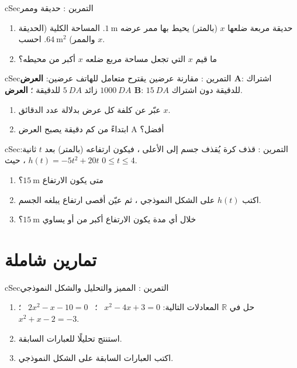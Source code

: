 \documentclass[12pt,a4paper]{article}
\newenvironment{BOX}[2]{\begin{otherlanguage}{english}\begin{arbox}{#1}{#2}}{\end{arbox}\end{otherlanguage}}
\newcounter{exo}
\newenvironment{tamrin}[1]{\stepcounter{exo}\begin{BOX}{cSec}{التمرين \theexo: #1}}{\end{BOX}}
\newcommand{\R}{\mathbb{R}}
\begin{document}
\begin{tamrin}{حديقة وممر}
\begin{enumerate}
\item حديقة مربعة ضلعها $x$ (بالمتر) يحيط بها ممر عرضه $1\ \text{m}$. المساحة الكلية (الحديقة والممر) $64\ \text{m}^2$. احسب $x$.
\item ما قيم $x$ التي تجعل مساحة مربع ضلعه $x$ أكبر من محيطه؟
\end{enumerate}
\end{tamrin}

\begin{tamrin}{مقارنة عرضين}
يقترح متعامل للهاتف عرضين: \textbf{العرض A}: اشتراك $1000\ DA$ زائد $5\ DA$ للدقيقة ؛ \textbf{العرض B}: $15\ DA$ للدقيقة دون اشتراك.
\begin{enumerate}
\item عبّر عن كلفة كل عرض بدلالة عدد الدقائق $x$.
\item ابتداءً من كم دقيقة يصبح العرض A أفضل؟
\end{enumerate}
\end{tamrin}

\begin{tamrin}{قذف كرة}
يُقذف جسم إلى الأعلى ، فيكون ارتفاعه (بالمتر) بعد $t$ ثانية: $h(t)=-5t^2+20t$ ، حيث $0\leqslant t\leqslant4$.
\begin{enumerate}
\item متى يكون الارتفاع $15\ \text{m}$؟
\item اكتب $h(t)$ على الشكل النموذجي ، ثم عيّن أقصى ارتفاع يبلغه الجسم.
\item خلال أي مدة يكون الارتفاع أكبر من أو يساوي $15\ \text{m}$؟
\end{enumerate}
\end{tamrin}

\section{تمارين شاملة}
\begin{tamrin}{المميز والتحليل والشكل النموذجي}
\begin{enumerate}
\item حل في $\R$ المعادلات التالية: \quad $x^2-4x+3=0$ \ ؛ \ $2x^2-x-10=0$ \ ؛ \ $x^2+x-2=-3$.
\item استنتج تحليلًا للعبارات السابقة.
\item اكتب العبارات السابقة على الشكل النموذجي.
\end{enumerate}
\end{tamrin}
\end{document}
